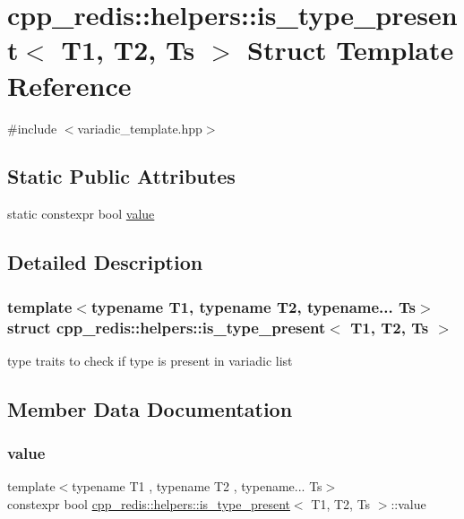 \hypertarget{structcpp__redis_1_1helpers_1_1is__type__present}{}\section{cpp\+\_\+redis\+:\+:helpers\+:\+:is\+\_\+type\+\_\+present$<$ T1, T2, Ts $>$ Struct Template Reference}
\label{structcpp__redis_1_1helpers_1_1is__type__present}


{\ttfamily \#include $<$variadic\+\_\+template.\+hpp$>$}

\subsection*{Static Public Attributes}
\begin{DoxyCompactItemize}
\item 
static constexpr bool \mbox{\hyperlink{structcpp__redis_1_1helpers_1_1is__type__present_a7b5e8d970ba974a9b58cbc440983c25c}{value}}
\end{DoxyCompactItemize}


\subsection{Detailed Description}
\subsubsection*{template$<$typename T1, typename T2, typename... Ts$>$\newline
struct cpp\+\_\+redis\+::helpers\+::is\+\_\+type\+\_\+present$<$ T1, T2, Ts $>$}

type traits to check if type is present in variadic list 

\subsection{Member Data Documentation}
\mbox{\label{structcpp__redis_1_1helpers_1_1is__type__present_a7b5e8d970ba974a9b58cbc440983c25c}} 
\subsubsection{\texorpdfstring{value}{value}}
{\footnotesize\ttfamily template$<$typename T1 , typename T2 , typename... Ts$>$ \\
constexpr bool \mbox{\hyperlink{structcpp__redis_1_1helpers_1_1is__type__present}{cpp\+\_\+redis\+::helpers\+::is\+\_\+type\+\_\+present}}$<$ T1, T2, Ts $>$\+::value\hspace{0.3cm}{\ttfamily [static]}}

